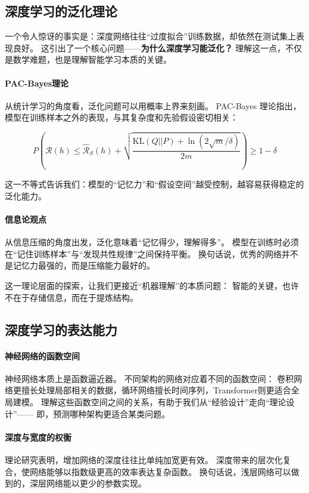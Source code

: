 \subsection{深度学习的泛化理论}

一个令人惊讶的事实是：深度网络往往“过度拟合”训练数据，却依然在测试集上表现良好。  
这引出了一个核心问题——\textbf{为什么深度学习能泛化？}  
理解这一点，不仅是数学难题，也是理解智能学习本质的关键。

\paragraph{PAC-Bayes理论}  
从统计学习的角度看，泛化问题可以用概率上界来刻画。  
PAC-Bayes 理论指出，模型在训练样本之外的表现，与其复杂度和先验假设密切相关：

$$
P\left(\mathcal{R}(h) \leq \hat{\mathcal{R}}_S(h) + 
\sqrt{\frac{\text{KL}(Q||P) + \ln(2\sqrt{m}/\delta)}{2m}}
\right) \geq 1-\delta
$$

这一不等式告诉我们：模型的“记忆力”和“假设空间”越受控制，越容易获得稳定的泛化能力。

\paragraph{信息论观点}  
从信息压缩的角度出发，泛化意味着“记忆得少，理解得多”。  
模型在训练时必须在“记住训练样本”与“发现共性规律”之间保持平衡。  
换句话说，优秀的网络并不是记忆力最强的，而是压缩能力最好的。  

这一理论层面的探索，让我们更接近“机器理解”的本质问题：  
智能的关键，也许不在于存储信息，而在于提炼结构。

\subsection{深度学习的表达能力}

\paragraph{神经网络的函数空间}  
神经网络本质上是函数逼近器。  
不同架构的网络对应着不同的函数空间：  
卷积网络更擅长处理局部相关的数据，循环网络擅长时间序列，Transformer则更适合全局建模。  
理解这些函数空间之间的关系，有助于我们从“经验设计”走向“理论设计”——  
即，预测哪种架构更适合某类问题。

\paragraph{深度与宽度的权衡}  
理论研究表明，增加网络的深度往往比单纯加宽更有效。  
深度带来的层次化复合，使网络能够以指数级更高的效率表达复杂函数。  
换句话说，浅层网络可以做到的，深层网络能以更少的参数实现。  

